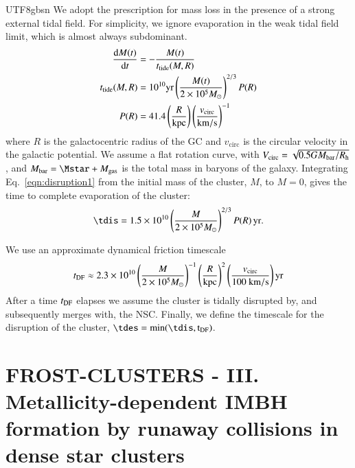 \documentclass[trackchanges, twocolappendix, twocolumn]{aastex701}
\begin{document}
\begin{CJK*}{UTF8}{gbsn}
We adopt the prescription for mass loss in the presence of a strong external tidal field. For simplicity, we ignore evaporation in the weak tidal field limit, which is almost always subdominant.
\begin{align}
\dfrac{\mathrm{d} M(t)}{\mathrm{d} t} & = - \dfrac{M (t)}{t_{\rm tide} (M, R)} \\
t_{\rm tide} (M, R) & = 10^{10} \mathrm{yr} \left( \dfrac{M (t)}{2 \times 10^5 M_\odot}\right)^{2/3} P (R) \\
P (R) & = 41.4 \left( \dfrac{R}{\rm kpc} \right) \left( \dfrac{v_{\rm circ}}{\rm km/s} \right)^{-1}
\label{eqn:disruption1}
\end{align}
where $R$ is the galactocentric radius of the GC and $v_{\mathrm{circ}}$ is the circular velocity in the galactic potential. We assume a flat rotation curve, with $V_{\mathrm{circ}} = \sqrt{0.5GM_{\mathrm{bar}}/R_{{\rm h}}}$,  and $M_{\mathrm{bar}} = \Mstar + M_{\mathrm{gas}}$ is the total mass in baryons of the galaxy. Integrating Eq.~\ref{eqn:disruption1} from the initial mass of the cluster, $M$, to $M=0$, gives the time to complete evaporation of the cluster:
\begin{align}
\tdis = 1.5 \times 10^{10}\left(\frac{M}{2 \times 10^5 M_\odot}\right)^{2/3}P(R)\,\mathrm{yr}.
\label{eqn:tdis}
\end{align}

We use an approximate dynamical friction timescale
\begin{align}
t_{\rm DF} \approx 2.3 \times 10^{10} \left( \dfrac{M}{2 \times 10^5 M_\odot}\right)^{-1} \left( \dfrac{R}{\rm kpc} \right)^2 \left( \dfrac{v_{\rm circ}}{100~\rm km/s} \right) \rm yr
\label{eq:t_DF}
\end{align}
After a time $t_{\rm DF}$ elapses we assume the cluster is tidally disrupted by, and subsequently merges with, the NSC. Finally, we define the timescale for the disruption of the cluster, $\tdes = \mathrm{min(\tdis, t_{\rm DF})}$.

\section{FROST-CLUSTERS - III. Metallicity-dependent IMBH formation by runaway collisions in dense star clusters}


\end{CJK*}
\end{document}

